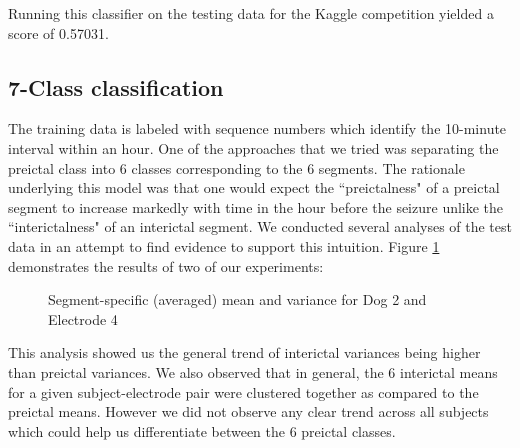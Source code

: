 \documentclass[a4paper]{article}
\begin{document}
Running this classifier on the testing data for the Kaggle competition yielded a score of 0.57031.

\subsection{7-Class classification}
The training data is labeled with sequence numbers which identify the 10-minute interval within an hour. One of the approaches that we tried was separating the preictal class into 6 classes corresponding to the 6 segments. The rationale underlying this model was that one would expect the ``preictalness" of a preictal segment to increase markedly with time in the hour before the seizure unlike the ``interictalness" of an interictal segment. We conducted several analyses of the test data in an attempt to find evidence to support this intuition. Figure \ref{fig:meanvar} demonstrates the results of two of our experiments:

\begin{figure}[H]
    \centering
    \qquad
    \caption{Segment-specific (averaged) mean and variance for Dog 2 and Electrode 4}%
    \label{fig:meanvar}%
\end{figure}

This analysis showed us the general trend of interictal variances being higher than preictal variances. We also observed that in general, the 6 interictal means for a given subject-electrode pair were clustered together as compared to the preictal means. However we did not observe any clear trend across all subjects which could help us differentiate between the 6 preictal classes.
\end{document}
